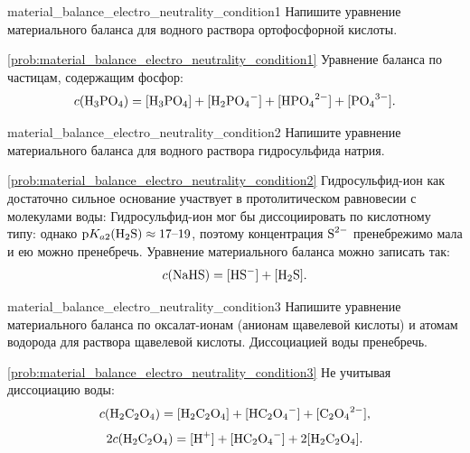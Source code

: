 \begin{problem}{}{material_balance_electro_neutrality_condition1}
    Напишите уравнение материального баланса для водного раствора ортофосфорной кислоты.
    \begin{sol}{\ref{prob:material_balance_electro_neutrality_condition1}}
        Уравнение баланса по частицам, содержащим фосфор:
        \begin{equation*}
            c(\ce{H3PO4}) = [\ce{H3PO4}] + [\ce{H2PO4^-}] + [\ce{HPO4^{2-}}] + [\ce{PO4^{3-}}].
        \end{equation*}
    \end{sol}
\end{problem}

\begin{problem}{}{material_balance_electro_neutrality_condition2}
    Напишите уравнение материального баланса для водного раствора гидросульфида натрия.
    \begin{sol}{\ref{prob:material_balance_electro_neutrality_condition2}}
        Гидросульфид-ион как достаточно сильное основание участвует в протолитическом равновесии с молекулами воды:
        Гидросульфид-ион мог бы диссоциировать по кислотному типу:
        однако $\text{p}K_{a2}(\ce{H2S}) \approx 17\text{--}19$, поэтому концентрация $\ce{S^{2-}}$ пренебрежимо мала и ею можно пренебречь. Уравнение материального баланса можно записать так:
        \begin{equation*}
            c(\ce{NaHS}) = [\ce{HS^-}] + [\ce{H2S}].
        \end{equation*}
    \end{sol}
\end{problem}

\begin{problem}{}{material_balance_electro_neutrality_condition3}
    Напишите уравнение материального баланса по оксалат-ионам (анионам щавелевой кислоты) и атомам водорода для раствора щавелевой кислоты. Диссоциацией воды пренебречь.
    \begin{sol}{\ref{prob:material_balance_electro_neutrality_condition3}}
        Не учитывая диссоциацию воды:
        \begin{equation*}
            c(\ce{H2C2O4}) = [\ce{H2C2O4}] + [\ce{HC2O4^-}] + [\ce{C2O4^{2-}}],
        \end{equation*}
        \begin{equation*}
            2c(\ce{H2C2O4}) = [\ce{H^+}] + [\ce{HC2O4^-}] + 2[\ce{H2C2O4}].
        \end{equation*}
    \end{sol}
\end{problem}

